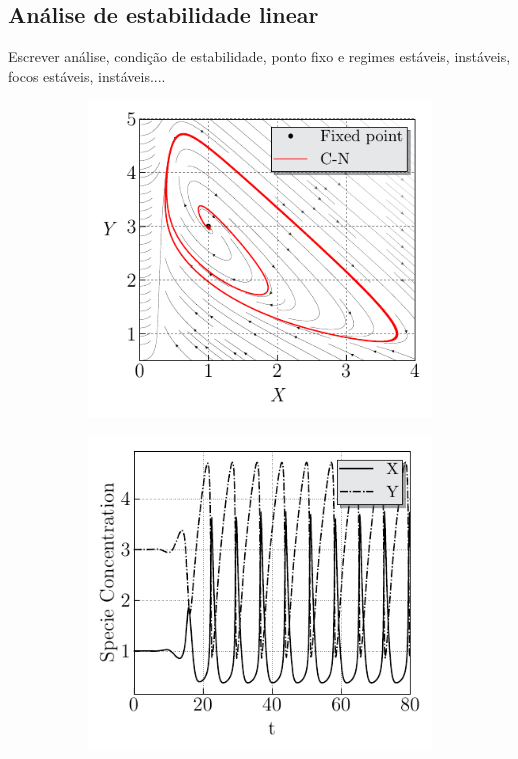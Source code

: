 \subsection{Análise de estabilidade linear}
\textcolor{red!}{Escrever análise, condição de estabilidade, ponto fixo e regimes estáveis, instáveis, focos estáveis, instáveis.... }

\begin{figure}[H]
    \begin{subfigure}{.5\textwidth}
    \centering
    \includegraphics[width=1.\linewidth, angle=0, clip]{03_Cap3/figures/Phase_Space_internal__Brusselator__CN.pdf}
    \end{subfigure}
    \begin{subfigure}{.5\textwidth}
    \centering
    \includegraphics[width=1.\linewidth, angle=0, clip]{03_Cap3/figures/Temporal_evolution_internal__Brusselator__CN.pdf}
    \end{subfigure}
    \vspace{-0.5cm}
\end{figure}
